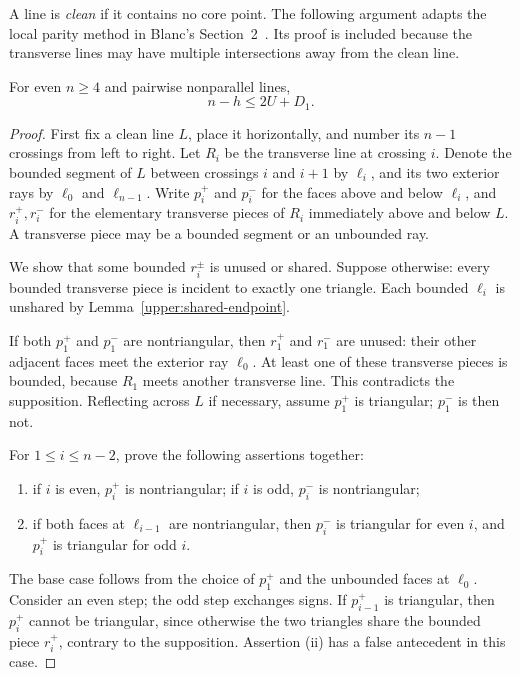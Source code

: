 A line is \emph{clean} if it contains no core point. The following argument adapts the local parity method in Blanc's Section~2~\citep{blanc2011}. Its proof is included because the transverse lines may have multiple intersections away from the clean line.

\begin{lemma}
\label{upper:clean-charge}
For even $n\ge4$ and pairwise nonparallel lines,
\begin{equation}
 n-h\le2U+D_1.
 \label{upper:charging}
\end{equation}
\end{lemma}

\begin{proof}
First fix a clean line $L$, place it horizontally, and number its $n-1$ crossings from left to right. Let $R_i$ be the transverse line at crossing $i$. Denote the bounded segment of $L$ between crossings $i$ and $i+1$ by $\ell_i$, and its two exterior rays by $\ell_0$ and $\ell_{n-1}$. Write $p_i^+$ and $p_i^-$ for the faces above and below $\ell_i$, and $r_i^+,r_i^-$ for the elementary transverse pieces of $R_i$ immediately above and below $L$. A transverse piece may be a bounded segment or an unbounded ray.

We show that some bounded $r_i^{\pm}$ is unused or shared. Suppose otherwise: every bounded transverse piece is incident to exactly one triangle. Each bounded $\ell_i$ is unshared by Lemma~\ref{upper:shared-endpoint}.

If both $p_1^+$ and $p_1^-$ are nontriangular, then $r_1^+$ and $r_1^-$ are unused: their other adjacent faces meet the exterior ray $\ell_0$. At least one of these transverse pieces is bounded, because $R_1$ meets another transverse line. This contradicts the supposition. Reflecting across $L$ if necessary, assume $p_1^+$ is triangular; $p_1^-$ is then not.

For $1\le i\le n-2$, prove the following assertions together:
\begin{enumerate}[label=(\roman*)]
\item if $i$ is even, $p_i^+$ is nontriangular; if $i$ is odd, $p_i^-$ is nontriangular;
\item if both faces at $\ell_{i-1}$ are nontriangular, then $p_i^-$ is triangular for even $i$, and $p_i^+$ is triangular for odd $i$.
\end{enumerate}
The base case follows from the choice of $p_1^+$ and the unbounded faces at $\ell_0$. Consider an even step; the odd step exchanges signs. If $p_{i-1}^+$ is triangular, then $p_i^+$ cannot be triangular, since otherwise the two triangles share the bounded piece $r_i^+$, contrary to the supposition. Assertion (ii) has a false antecedent in this case.


\end{proof}

